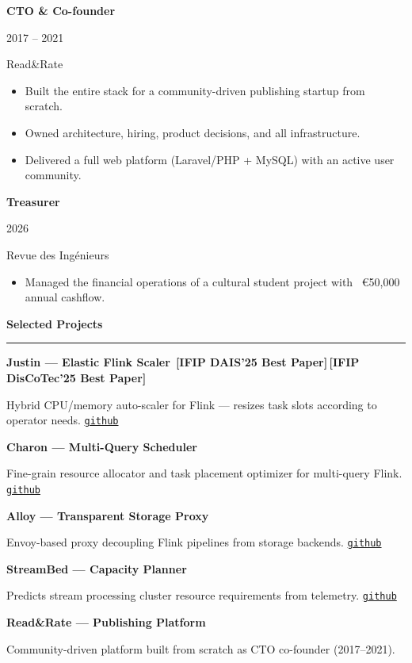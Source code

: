 \documentclass[9.5pt, a4paper]{article}
\newlength{\mainW}  \setlength{\mainW}{0.68\paperwidth}
\newlength{\mpad}   \setlength{\mpad}{8mm}
\newcommand{\mainsec}[1]{%
  \vspace{4pt}%
  {\large\bfseries\color{dark} #1}\par\nopagebreak
  {\color{dark!30}\rule{\linewidth}{0.7pt}}\par
  \vspace{2pt}%
}
\newcommand{\jobentry}[4]{%
  {\bfseries\color{dark}\small #2}\par
  {\color{accent}\footnotesize #1}\par
  {\color{muted}\footnotesize #3}\par
  \vspace{1pt}%
  #4%
  \vspace{4pt}%
}
\newcommand{\award}[1]{\,{\scriptsize\bfseries\color{award}[#1]}}
\begin{document}
\begin{minipage}[t]{\mainW}
\begin{minipage}[t]{\mainW - 2\mpad}
\jobentry{2017 – 2021}
  {CTO \& Co-founder}
  {Read\&Rate}
  {\begin{itemize}\small
    \item Built the entire stack for a community-driven publishing startup from scratch.
    \item Owned architecture, hiring, product decisions, and all infrastructure.
    \item Delivered a full web platform (Laravel/PHP + MySQL) with an active user community.
  \end{itemize}}

\jobentry{2026}
  {Treasurer}
  {Revue des Ingénieurs}
  {\begin{itemize}\small
    \item Managed the financial operations of a cultural student project with ~\euro{}50{,}000 annual cashflow.
  \end{itemize}}

\mainsec{Selected Projects}

{\bfseries\color{dark}\small Justin — Elastic Flink Scaler}%
\award{IFIP DAIS'25 Best Paper}\award{IFIP DisCoTec'25 Best Paper}\par
{\color{muted}\footnotesize Hybrid CPU/memory auto-scaler for Flink — resizes task slots according to operator needs.
\href{https://github.com/CloudLargeScale-UCLouvain/flink-justin}{\texttt{github}}}\par\vspace{3pt}

{\bfseries\color{dark}\small Charon — Multi-Query Scheduler}\par
{\color{muted}\footnotesize Fine-grain resource allocator and task placement optimizer for multi-query Flink.
\href{https://github.com/CloudLargeScale-UCLouvain/charon}{\texttt{github}}}\par\vspace{3pt}

{\bfseries\color{dark}\small Alloy — Transparent Storage Proxy}\par
{\color{muted}\footnotesize Envoy-based proxy decoupling Flink pipelines from storage backends.
\href{https://github.com/CloudLargeScale-UCLouvain/alloy}{\texttt{github}}}\par\vspace{3pt}

{\bfseries\color{dark}\small StreamBed — Capacity Planner}\par
{\color{muted}\footnotesize Predicts stream processing cluster resource requirements from telemetry.
\href{https://github.com/CloudLargeScale-UCLouvain/StreamBed}{\texttt{github}}}\par\vspace{3pt}

{\bfseries\color{dark}\small Read\&Rate — Publishing Platform}\par
{\color{muted}\footnotesize Community-driven platform built from scratch as CTO co-founder (2017–2021).}

\end{minipage}
\end{minipage}
\end{document}
